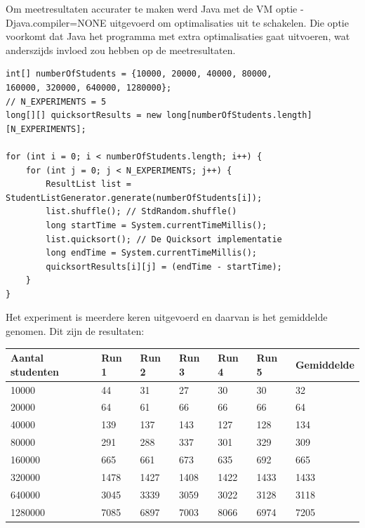 \documentclass[12pt,notitlepage]{article}
\begin{document}
Om meetresultaten accurater te maken werd Java met de VM optie \textsf{-Djava.compiler=NONE} uitgevoerd om optimalisaties uit te schakelen. Die optie voorkomt dat Java het programma met extra optimalisaties gaat uitvoeren, wat anderszijds invloed zou hebben op de meetresultaten.

\begin{lstlisting}
int[] numberOfStudents = {10000, 20000, 40000, 80000, 
160000, 320000, 640000, 1280000};
// N_EXPERIMENTS = 5
long[][] quicksortResults = new long[numberOfStudents.length][N_EXPERIMENTS]; 

for (int i = 0; i < numberOfStudents.length; i++) {
    for (int j = 0; j < N_EXPERIMENTS; j++) {
        ResultList list = StudentListGenerator.generate(numberOfStudents[i]);
        list.shuffle(); // StdRandom.shuffle()
        long startTime = System.currentTimeMillis();
        list.quicksort(); // De Quicksort implementatie
        long endTime = System.currentTimeMillis();
        quicksortResults[i][j] = (endTime - startTime);
    }
}
\end{lstlisting}

Het experiment is meerdere keren uitgevoerd en daarvan is het gemiddelde genomen. Dit zijn de resultaten:

\begin{center}
\begin{table}[htb]
\begin{tabular}{| l | l | l | l | l | l | l |}
\hline
Aantal studenten & Run 1 & Run 2 & Run 3 & Run 4 & Run 5 & Gemiddelde\\ \hline
10000 & 44 & 31 & 27 & 30 & 30 & 32\\ \hline
20000 & 64 & 61 & 66 & 66 & 66 & 64\\ \hline
40000 & 139 & 137 & 143 & 127 & 128 & 134\\ \hline
80000 & 291 & 288 & 337 & 301 & 329 & 309\\ \hline
160000 & 665 & 661 & 673 & 635 & 692 & 665\\ \hline
320000 & 1478 & 1427 & 1408 & 1422 & 1433 & 1433\\ \hline
640000 & 3045 & 3339 & 3059 & 3022 & 3128 & 3118\\ \hline
1280000 & 7085 & 6897 & 7003 & 8066 & 6974 & 7205\\ \hline
\end{tabular}
\end{table}
\end{center}
\end{document}
